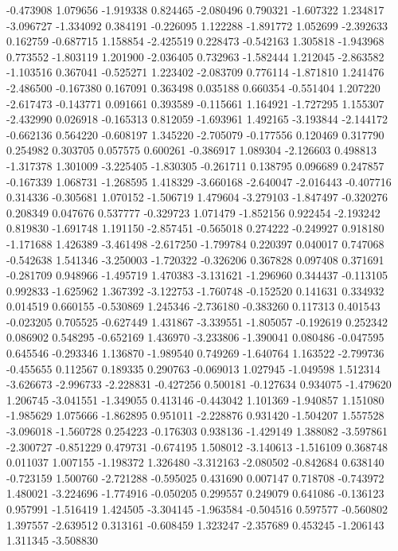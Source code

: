 -0.473908
1.079656
-1.919338
0.824465
-2.080496
0.790321
-1.607322
1.234817
-3.096727
-1.334092
0.384191
-0.226095
1.122288
-1.891772
1.052699
-2.392633
0.162759
-0.687715
1.158854
-2.425519
0.228473
-0.542163
1.305818
-1.943968
0.773552
-1.803119
1.201900
-2.036405
0.732963
-1.582444
1.212045
-2.863582
-1.103516
0.367041
-0.525271
1.223402
-2.083709
0.776114
-1.871810
1.241476
-2.486500
-0.167380
0.167091
0.363498
0.035188
0.660354
-0.551404
1.207220
-2.617473
-0.143771
0.091661
0.393589
-0.115661
1.164921
-1.727295
1.155307
-2.432990
0.026918
-0.165313
0.812059
-1.693961
1.492165
-3.193844
-2.144172
-0.662136
0.564220
-0.608197
1.345220
-2.705079
-0.177556
0.120469
0.317790
0.254982
0.303705
0.057575
0.600261
-0.386917
1.089304
-2.126603
0.498813
-1.317378
1.301009
-3.225405
-1.830305
-0.261711
0.138795
0.096689
0.247857
-0.167339
1.068731
-1.268595
1.418329
-3.660168
-2.640047
-2.016443
-0.407716
0.314336
-0.305681
1.070152
-1.506719
1.479604
-3.279103
-1.847497
-0.320276
0.208349
0.047676
0.537777
-0.329723
1.071479
-1.852156
0.922454
-2.193242
0.819830
-1.691748
1.191150
-2.857451
-0.565018
0.274222
-0.249927
0.918180
-1.171688
1.426389
-3.461498
-2.617250
-1.799784
0.220397
0.040017
0.747068
-0.542638
1.541346
-3.250003
-1.720322
-0.326206
0.367828
0.097408
0.371691
-0.281709
0.948966
-1.495719
1.470383
-3.131621
-1.296960
0.344437
-0.113105
0.992833
-1.625962
1.367392
-3.122753
-1.760748
-0.152520
0.141631
0.334932
0.014519
0.660155
-0.530869
1.245346
-2.736180
-0.383260
0.117313
0.401543
-0.023205
0.705525
-0.627449
1.431867
-3.339551
-1.805057
-0.192619
0.252342
0.086902
0.548295
-0.652169
1.436970
-3.233806
-1.390041
0.080486
-0.047595
0.645546
-0.293346
1.136870
-1.989540
0.749269
-1.640764
1.163522
-2.799736
-0.455655
0.112567
0.189335
0.290763
-0.069013
1.027945
-1.049598
1.512314
-3.626673
-2.996733
-2.228831
-0.427256
0.500181
-0.127634
0.934075
-1.479620
1.206745
-3.041551
-1.349055
0.413146
-0.443042
1.101369
-1.940857
1.151080
-1.985629
1.075666
-1.862895
0.951011
-2.228876
0.931420
-1.504207
1.557528
-3.096018
-1.560728
0.254223
-0.176303
0.938136
-1.429149
1.388082
-3.597861
-2.300727
-0.851229
0.479731
-0.674195
1.508012
-3.140613
-1.516109
0.368748
0.011037
1.007155
-1.198372
1.326480
-3.312163
-2.080502
-0.842684
0.638140
-0.723159
1.500760
-2.721288
-0.595025
0.431690
0.007147
0.718708
-0.743972
1.480021
-3.224696
-1.774916
-0.050205
0.299557
0.249079
0.641086
-0.136123
0.957991
-1.516419
1.424505
-3.304145
-1.963584
-0.504516
0.597577
-0.560802
1.397557
-2.639512
0.313161
-0.608459
1.323247
-2.357689
0.453245
-1.206143
1.311345
-3.508830
